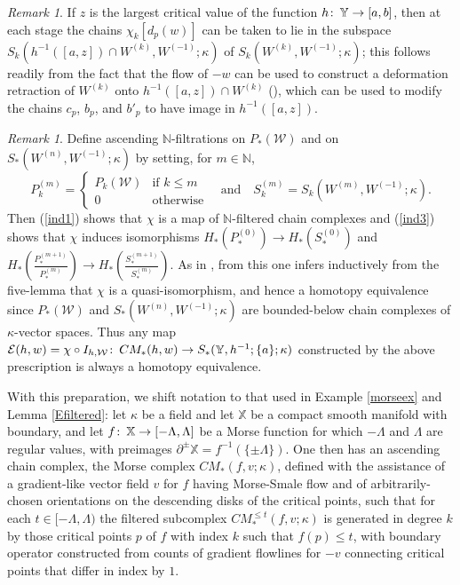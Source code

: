 \documentclass[11pt]{amsart}
\theoremstyle{definition}
\theoremstyle{remark}
\newtheorem{remark}[theorem]{Remark}
\numberwithin{equation}{section}
\def\co{\colon\thinspace}
\def\N{\mathbb{N}}
\begin{document}
\begin{remark}\label{deftocrit} If  $z$ is the largest critical value of the function $h\co \mathbb{Y}\to[a,b]$, then at each stage the chains $\chi_k[d_p(w)]$ can be taken to lie in the subspace $S_k(h^{-1}([a,z])\cap W^{(k)},W^{(-1)};\kappa)$ of $S_k(W^{(k)},W^{(-1)};\kappa)$; this follows readily from the fact that the flow of $-w$ can be used to construct a deformation retraction of  $W^{(k)}$ onto $h^{-1}([a,z])\cap W^{(k)}$ (\cite[Remark 3.4]{Mil}), which can be used to modify the chains $c_p$, $b_p$, and $b'_p$ to have image in $h^{-1}([a,z])$.
\end{remark}

\begin{remark}Define ascending $\N$-filtrations on $P_*(\mathcal{W})$ and on $S_*(W^{(n)},W^{(-1)};\kappa)$ by setting, for $m\in \N$, \[ P^{(m)}_{k}=\left\{\begin{array}{ll}P_{k}(\mathcal{W}) & \mbox{if }k\leq m\\ 0 &\mbox{otherwise} \end{array}\right. \quad\mbox{and}\quad S^{(m)}_{k}=S_k(W^{(m)},W^{(-1)};\kappa).  \]  Then (\ref{ind1}) shows that $\chi$ is a map of $\N$-filtered chain complexes and (\ref{ind3}) shows that $\chi$ induces isomorphisms $H_*(P^{(0)}_{*})\to H_*(S^{(0)}_{*})$  and $H_*\left(\frac{P^{(m+1)}_*}{P^{(m)}_{*}}\right)\to H_*\left(\frac{S^{(m+1)}_*}{S^{(m)}_{*}}\right)$. As in \cite[Proof of Corollary 6.3.8]{Paj}, from this one infers inductively from the five-lemma that $\chi$ is a quasi-isomorphism, and hence a homotopy equivalence since $P_*(\mathcal{W})$ and $S_*(W^{(n)},W^{(-1)};\kappa)$ are bounded-below chain complexes of $\kappa$-vector spaces. Thus any map $\mathcal{E}(h,w)=\chi\circ I_{h,\mathcal{W}}\co CM_*(h,w)\to S_*(\mathbb{Y},h^{-1};\{a\};\kappa)$ constructed by the above prescription is always a homotopy equivalence. \end{remark}

With this preparation, we shift notation to that used in  Example \ref{morseex} and Lemma \ref{Efiltered}: let $\kappa$ be a field and let $\mathbb{X}$ be a compact smooth manifold with boundary, and let $f\co \mathbb{X}\to [-\Lambda,\Lambda]$ be a Morse function for which $-\Lambda$ and $\Lambda$ are regular values, with preimages $\partial^{\pm}\mathbb{X}=f^{-1}(\{\pm\Lambda\})$.  One then has an ascending chain complex, the Morse complex $CM_{*}(f,v;\kappa)$, defined with the assistance of a gradient-like vector field $v$ for $f$ having Morse-Smale flow and of arbitrarily-chosen orientations on the descending disks of the critical points, such that for each $t\in [-\Lambda,\Lambda)$ the filtered subcomplex $CM_{*}^{\leq t}(f,v;\kappa)$ is generated in degree $k$ by those critical points $p$ of $f$ with index $k$ such that $f(p)\leq t$, with boundary operator constructed from counts of gradient flowlines for $-v$ connecting critical points that differ in index by $1$.  
\end{document}
